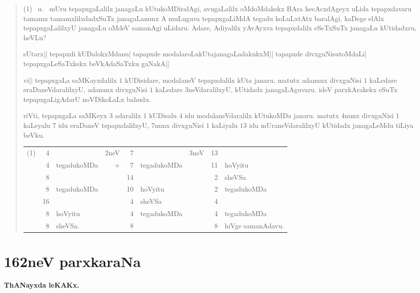 \begin{verse}
{\rm(1)}~ u.~ mUru tepapxgaLalilx janagaLu kUtukoMDiralAgi,
avugaLalilx oMdoMdakekx BAra hecAcxdAgeyx uLida tepapxdavaru tamamx
tamamxlilxdadxSuTx janagaLanunx A muLuguva tepapxgaLiMdA tegadu
koLuLxtAtx baralAgi, kaDege elAlx tepapxgaLalilxyU janagaLu oMdeV
samanAgi uLidaru. Adare, Adiyalilx yAvAyxva tepapxdalilx eSeTxSuTx
janagaLu kUtidadxru, heVLu?

sUtarx|| tepapxdi kUDalokxMdanu| tapapxde
modalaroLukUtajanagaLadakukxM|| tapapxde divxguNisutoMdaLi|
tepapxgaLeSaTxkekx beVkAdaSaTxku gaNakA||

vi|| tepapxgaLa saMKayxdalilx $1$ kUDisidare, modalaneV tepapxdalilx
kUta janaru. matutx adanunx divxguNisi $1$ kaLedare
eraDaneVdaralilxyU, adanunx divxguNisi $1$ kaLedare $3$neVdaralilxyU,
kUtidadx janagaLAguvaru. ideV parxkArakekx eSuTx tepapxgaLigAdarU
noVDikoLaLx bahudu. 

riVti, tepapxgaLa saMKeyx $3$ adaralilx $1$ kUDisalu $4$ idu
modalaneVdaralilx kUtukoMDa janaru. matutx $4$nunx divxguNisi $1$
kaLeyalu $7$ idu eraDaneV tepapxdalilxyU, $7$nunx divxguNisi $1$
kaLiyalu $13$ idu mUraneVdaralilxyU kUtidadx janagaLeMdu tiLiya beVku.
\begin{center}
\begin{tabular}{r@{\;\,}>{\rm}rl@{\qquad}r@{\;\;}>{\rm}rl@{\qquad}r@{\;\;}>{\rm}rl}
{\rm(1)} & 4 & & $2$neV & 7 & & $3$neV & 13 & \\
 & 4 & tegadukoMDa & + & 7 & tegadukoMDa & & 11 & hoVyitu\\
\cline{2-2}
\cline{5-5}
\cline{8-8}
 & 8 & && 14  & & & 2 & sheVSa\\
 & 8 & tegadukoMDa & & 10 &  hoVyitu & & 2 & tegadukoMDa\\
\cline{2-2}
\cline{5-5}
\cline{8-8}
& 16 & & & 4 & sheVSa & & 4 &\\
 & 8 & hoVyitu & & 4 & tegadukoMDa & & 4 & tegadukoMDa\\
\cline{2-2}
\cline{5-5}
\cline{8-8}
 & 8 & sheVSa. & & 8 & & & 8 & hiVge samanAdavu.  
\end{tabular}
\end{center}
\end{verse}


\chapter{162neV parxkaraNa}

\begin{center}
{\large\bf ThANayxda leKAKx.}
\end{center}

